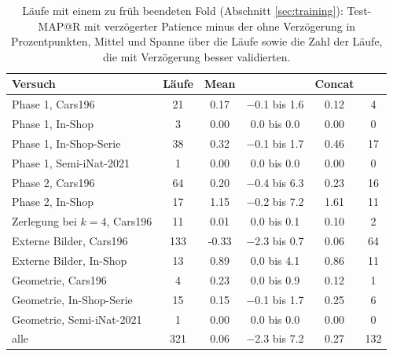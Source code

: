 \begin{table}[tbp]
\centering
\caption[Wirkung der verzögerten Patience]{Läufe mit einem zu früh beendeten Fold (Abschnitt \ref{sec:training}): Test-MAP@R mit verzögerter Patience minus der ohne Verzögerung in Prozentpunkten, Mittel und Spanne über die Läufe sowie die Zahl der Läufe, die mit Verzögerung besser validierten.}
\label{tab:anhang:verzoegerung}
\small
\begin{tabular}{@{}l S[table-format=3.0] S[table-format=-1.2] c S[table-format=-1.2] S[table-format=3.0]@{}}
\toprule
{Versuch} & {Läufe} & {Mean} & {} & {Concat} & {} \\
\midrule
Phase 1, Cars196 & 21 & 0.17 & \num{-0.1} bis \num{1.6} & 0.12 & 4 \\
Phase 1, In-Shop & 3 & 0.00 & \num{0.0} bis \num{0.0} & 0.00 & 0 \\
Phase 1, In-Shop-Serie & 38 & 0.32 & \num{-0.1} bis \num{1.7} & 0.46 & 17 \\
Phase 1, Semi-iNat-2021 & 1 & 0.00 & \num{0.0} bis \num{0.0} & 0.00 & 0 \\
Phase 2, Cars196 & 64 & 0.20 & \num{-0.4} bis \num{6.3} & 0.23 & 16 \\
Phase 2, In-Shop & 17 & 1.15 & \num{-0.2} bis \num{7.2} & 1.61 & 11 \\
Zerlegung bei $k=4$, Cars196 & 11 & 0.01 & \num{0.0} bis \num{0.1} & 0.10 & 2 \\
Externe Bilder, Cars196 & 133 & -0.33 & \num{-2.3} bis \num{0.7} & 0.06 & 64 \\
Externe Bilder, In-Shop & 13 & 0.89 & \num{0.0} bis \num{4.1} & 0.86 & 11 \\
Geometrie, Cars196 & 4 & 0.23 & \num{0.0} bis \num{0.9} & 0.12 & 1 \\
Geometrie, In-Shop-Serie & 15 & 0.15 & \num{-0.1} bis \num{1.7} & 0.25 & 6 \\
Geometrie, Semi-iNat-2021 & 1 & 0.00 & \num{0.0} bis \num{0.0} & 0.00 & 0 \\
\midrule
alle & 321 & 0.06 & \num{-2.3} bis \num{7.2} & 0.27 & 132 \\
\bottomrule
\end{tabular}
\end{table}
